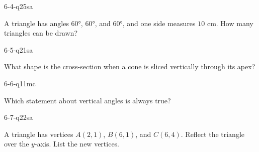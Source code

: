 \begin{practiceQuestion}{6-4-q25}{sa}
\begin{questionText}
A triangle has angles $60°$, $60°$, and $60°$, and one side measures $10$ cm. How many triangles can be drawn?
\end{questionText}
\end{practiceQuestion}

\begin{practiceQuestion}{6-5-q21}{sa}
\begin{questionText}
What shape is the cross-section when a cone is sliced vertically through its apex?
\end{questionText}
\end{practiceQuestion}

\begin{practiceQuestion}{6-6-q11}{mc}
\begin{questionText}
Which statement about vertical angles is always true?
\end{questionText}
\end{practiceQuestion}

\begin{practiceQuestion}{6-7-q22}{sa}
\begin{questionText}
A triangle has vertices $A(2, 1)$, $B(6, 1)$, and $C(6, 4)$. Reflect the triangle over the $y$-axis. List the new vertices.
\end{questionText}
\end{practiceQuestion}

